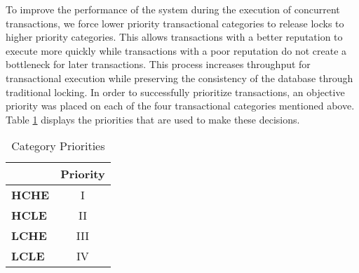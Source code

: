 \documentclass[conference]{IEEEtran}
\begin{document}
To improve the performance of the system during the execution of concurrent transactions, we force lower priority transactional categories to release locks to higher priority categories. This allows transactions with a better reputation to execute more quickly while transactions with a poor reputation do not create a bottleneck for later transactions. This process increases throughput for transactional execution while preserving the consistency of the database through traditional locking. In order to successfully prioritize transactions, an objective priority was placed on each of the four transactional categories mentioned above. Table \ref{tbl:priority} displays the priorities that are used to make these decisions.

\begin{table}[h]
\captionsetup{justification=centering}
\centering
\begin{tabular}{l|c|}
\cline{2-2}
                                          & \multicolumn{1}{l|}{\textbf{Priority}} \\ \hline
\multicolumn{1}{|l|}{\textbf{HCHE}}  & I                                      \\ \hline
\multicolumn{1}{|l|}{\textbf{HCLE}}  & II                                     \\ \hline
\multicolumn{1}{|l|}{\textbf{LCHE}} & III                                     \\ \hline
\multicolumn{1}{|l|}{\textbf{LCLE}} & IV                                      \\ \hline
\end{tabular}

\caption{Category Priorities} %
\label{tbl:priority} %

\end{table}
\end{document}
